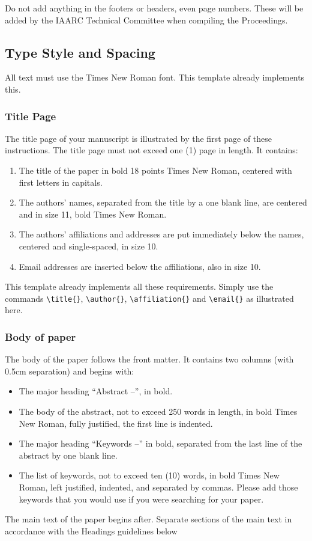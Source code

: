 \documentclass[a4paper, 10pt, twocolumn, twoside]{article}
\begin{document}
Do not add anything in the footers or headers, even page numbers. These will be added by the IAARC Technical Committee when compiling the Proceedings.

\subsection{Type Style and Spacing}

All text must use the Times New Roman font.
This  template already implements this.

\subsubsection{Title Page}

The title page of your manuscript is illustrated by the first page of these instructions. The title page must not exceed one (1) page in length. It contains:
\begin{enumerate}[noitemsep]
    \item The title of the paper in bold 18 points Times New Roman, centered with first letters in capitals.
    \item The authors’ names, separated from the title by a one blank line, are centered and in size 11, bold Times New Roman.
    \item The authors’ affiliations and addresses are put immediately below the names, centered and single-spaced, in size 10.
    \item 	Email addresses are inserted below the affiliations, also in size 10.
\end{enumerate}

This template already implements all these requirements. Simply use the commands \verb|\title{}|, \verb|\author{}|, \verb|\affiliation{}| and \verb|\email{}| as illustrated here.

\subsubsection{Body of paper}

The body of the paper follows the front matter. It contains two columns (with 0.5cm separation) and begins with:
\begin{itemize}[noitemsep]
    \item The major heading “Abstract –”, in bold.
    \item 	The body of the abstract, not to exceed 250 words in length, in bold Times New Roman, fully justified, the first line is indented.
    \item The major heading “Keywords –” in bold, separated from the last line of the abstract by one blank line.
    \item The list of keywords, not to exceed ten (10) words, in bold Times New Roman, left justified, indented, and separated by commas. Please add those keywords that you would use if you were searching for your paper. 
    
\end{itemize}
The main text of the paper begins after. Separate sections of the main text in accordance with the Headings guidelines below
\end{document}
